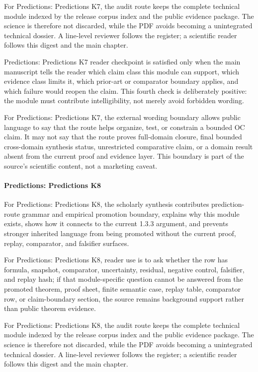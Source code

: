For Predictions: Predictions K7, the audit route keeps the complete technical module indexed by the release corpus index and the public evidence package. The science is therefore not discarded, while the PDF avoids becoming a unintegrated technical dossier. A line-level reviewer follows the register; a scientific reader follows this digest and the main chapter.


Predictions: Predictions K7 reader checkpoint is satisfied only when the main manuscript tells the reader which claim class this module can support, which evidence class limits it, which prior-art or comparator boundary applies, and which failure would reopen the claim. This fourth check is deliberately positive: the module must contribute intelligibility, not merely avoid forbidden wording.


For Predictions: Predictions K7, the external wording boundary allows public language to say that the route helps organize, test, or constrain a bounded OC claim. It may not say that the route proves full-domain closure, final bounded cross-domain synthesis status, unrestricted comparative claim, or a domain result absent from the current proof and evidence layer. This boundary is part of the source's scientific content, not a marketing caveat.


\paragraph{Predictions: Predictions K8}

For Predictions: Predictions K8, the scholarly synthesis contributes prediction-route grammar and empirical promotion boundary, explains why this module exists, shows how it connects to the current 1.3.3 argument, and prevents stronger inherited language from being promoted without the current proof, replay, comparator, and falsifier surfaces.


For Predictions: Predictions K8, reader use is to ask whether the row has formula, snapshot, comparator, uncertainty, residual, negative control, falsifier, and replay hash; if that module-specific question cannot be answered from the promoted theorem, proof sheet, finite semantic case, replay table, comparator row, or claim-boundary section, the source remains background support rather than public theorem evidence.


For Predictions: Predictions K8, the audit route keeps the complete technical module indexed by the release corpus index and the public evidence package. The science is therefore not discarded, while the PDF avoids becoming a unintegrated technical dossier. A line-level reviewer follows the register; a scientific reader follows this digest and the main chapter.


